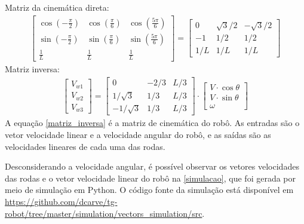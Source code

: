 Matriz da cinemática direta:
\begin{gather}
	\begin{bmatrix}
		\cos{\left(-\frac{\pi}{2}\right)} & \cos{\left(\frac{\pi}{6}\right)} & \cos{\left(\frac{5\pi}{6}\right)} \\
		\sin{\left(-\frac{\pi}{2}\right)} & \sin{\left(\frac{\pi}{6}\right)} & \sin{\left(\frac{5\pi}{6}\right)} \\
		\frac{1}{L} & \frac{1}{L} & \frac{1}{L}
	\end{bmatrix}
	=
	\begin{bmatrix}
		0 & \sqrt{3}/2 & -\sqrt{3}/2 \\
		-1 & 1/2 & 1/2  \\
		1/L & 1/L & 1/L
	\end{bmatrix}
\end{gather}
Matriz inversa:
\begin{gather}
	\label{matriz_inversa}
	\begin{bmatrix} V_{w1} \\  V_{w2} \\  V_{w3} \end{bmatrix}
	=
	\begin{bmatrix}
		0 & -2/3 & L/3 \\
		1/\sqrt{3} & 1/3 & L/3\\
		-1/\sqrt{3} & 1/3 & L/3
	\end{bmatrix}
	\cdot
	\begin{bmatrix} V\cdot \cos{\theta} \\  V\cdot \sin{\theta} \\  \omega \end{bmatrix}
\end{gather}
A equação \eqref{matriz_inversa} é a matriz de cinemática do robô.
As entradas são o vetor velocidade linear e a velocidade angular do robô, e as
saídas são as velocidades lineares de cada uma das rodas.

Desconsiderando a velocidade angular, é possível observar os vetores velocidades
das rodas e o vetor velocidade linear do robô na \autoref{simulacao}, que
foi gerada por meio de simulação em Python. O código fonte da simulação está
disponível em \url{https://github.com/dcarve/tg-robot/tree/master/simulation/vectors_simulation/src}.

